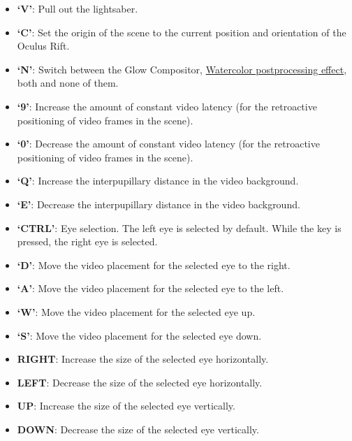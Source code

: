 \begin{itemize}
\itemsep1pt\parskip0pt
\item
  \textbf{`V'}: Pull out the lightsaber.
\item
  \textbf{`C'}: Set the origin of the scene to the current position and
  orientation of the Oculus Rift.
\item
  \textbf{`N'}: Switch between the Glow Compositor,
  \hyperref[sec:postprocessing]{Watercolor
  postprocessing effect}, both and none of them.
\item
  \textbf{`9'}: Increase the amount of constant video latency (for the
  retroactive positioning of video frames in the scene).
\item
  \textbf{`0'}: Decrease the amount of constant video latency (for the
  retroactive positioning of video frames in the scene).
\item
  \textbf{`Q'}: Increase the interpupillary distance in the video
  background.
\item
  \textbf{`E'}: Decrease the interpupillary distance in the video
  background.
\item
  \textbf{`CTRL'}: Eye selection. The left eye is selected by default.
  While the key is pressed, the right eye is selected.
\item
  \textbf{`D'}: Move the video placement for the selected eye to the
  right.
\item
  \textbf{`A'}: Move the video placement for the selected eye to the
  left.
\item
  \textbf{`W'}: Move the video placement for the selected eye up.
\item
  \textbf{`S'}: Move the video placement for the selected eye down.
\item
  \textbf{RIGHT}: Increase the size of the selected eye horizontally.
\item
  \textbf{LEFT}: Decrease the size of the selected eye horizontally.
\item
  \textbf{UP}: Increase the size of the selected eye vertically.
\item
  \textbf{DOWN}: Decrease the size of the selected eye vertically.
\end{itemize}